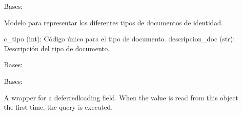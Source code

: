 \documentclass[letterpaper,10pt,spanish]{sphinxmanual}
\begin{document}
\begin{fulllineitems}

\pysigstartsignatures
{}
\pysigstopsignatures
\sphinxAtStartPar
Bases: 

\sphinxAtStartPar
Modelo para representar los diferentes tipos de documentos de identidad.
\begin{description}
\sphinxAtStartPar
c\_tipo (int): Código único para el tipo de documento.
descripcion\_doc (str): Descripción del tipo de documento.

\end{description}


\begin{fulllineitems}

\pysigstartsignatures
{}
\pysigstopsignatures
\sphinxAtStartPar
Bases: 

\end{fulllineitems}



\begin{fulllineitems}

\pysigstartsignatures
{}
\pysigstopsignatures
\sphinxAtStartPar
Bases: 

\end{fulllineitems}



\begin{fulllineitems}

\pysigstartsignatures
{}
\pysigstopsignatures
\sphinxAtStartPar
A wrapper for a deferred\sphinxhyphen{}loading field. When the value is read from this
object the first time, the query is executed.

\end{fulllineitems}



\begin{fulllineitems}


\end{fulllineitems}
\end{fulllineitems}
\end{document}
